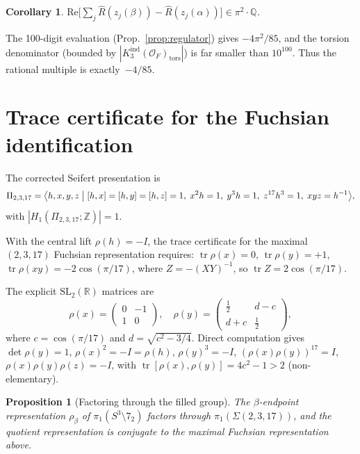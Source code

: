 \documentclass[11pt]{article}
\newtheorem{proposition}[theorem]{Proposition}
\newtheorem{corollary}[theorem]{Corollary}
\theoremstyle{remark}
\begin{document}
\begin{corollary}\label{cor:rational}
$\mathrm{Re}\bigl[\sum_j \hat{R}(z_j(\beta))
- \hat{R}(z_j(\alpha))\bigr] \in \pi^2 \cdot \mathbb{Q}$.
\end{corollary}

The 100-digit evaluation (Prop.~\ref{prop:regulator})
gives $-4\pi^2/85$, and the torsion denominator
(bounded by $|K_3^{\mathrm{ind}}(\mathcal{O}_F)_{\mathrm{tors}}|$)
is far smaller than $10^{100}$.  Thus the rational multiple
is exactly~$-4/85$.

\section{Trace certificate for the Fuchsian identification}

The corrected Seifert presentation is
\[
\Pi_{2,3,17} = \bigl\langle h,x,y,z \bigm|
[h,x]=[h,y]=[h,z]=1,\;
x^2 h = 1,\; y^3 h = 1,\; z^{17} h^3 = 1,\;
xyz = h^{-1}\bigr\rangle,
\]
with $|H_1(\Pi_{2,3,17}; \mathbb{Z})| = 1$.

With the central lift $\rho(h) = -I$, the trace certificate
for the maximal $(2,3,17)$ Fuchsian representation requires:
$\operatorname{tr}\rho(x) = 0$,
$\operatorname{tr}\rho(y) = +1$,
$\operatorname{tr}\rho(xy) = -2\cos(\pi/17)$,
where $Z = -(XY)^{-1}$, so $\operatorname{tr} Z = 2\cos(\pi/17)$.

The explicit $\mathrm{SL}_2(\mathbb{R})$ matrices are
\[
\rho(x) = \begin{pmatrix} 0 & -1 \\ 1 & 0 \end{pmatrix},
\quad
\rho(y) = \begin{pmatrix}
\frac{1}{2} & d - c \\[1mm]
d + c & \frac{1}{2}
\end{pmatrix},
\]
where $c = \cos(\pi/17)$ and $d = \sqrt{c^2 - 3/4}$.
Direct computation gives $\det\rho(y) = 1$,
$\rho(x)^2 = -I = \rho(h)$,
$\rho(y)^3 = -I$, $(\rho(x)\rho(y))^{17} = I$,
$\rho(x)\rho(y)\rho(z) = -I$, with
$\operatorname{tr}[\rho(x), \rho(y)] = 4c^2 - 1 > 2$
(non-elementary).

\begin{proposition}[Factoring through the filled group]
\label{prop:factor}
The $\beta$-endpoint representation $\rho_\beta$ of
$\pi_1(S^3 \setminus 7_2)$ factors through
$\pi_1(\Sigma(2,3,17))$, and the quotient representation
is conjugate to the maximal Fuchsian representation above.
\end{proposition}
\end{document}
